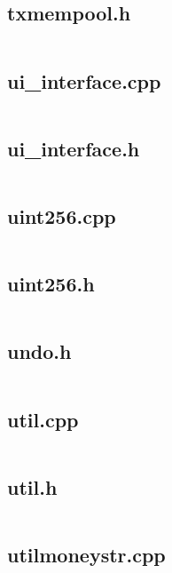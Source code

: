 \documentclass{article}
\begin{document}
\subsection{txmempool.h}
\inputminted{cpp}{/home/dufferzafar/dev/@clones/bitcoin/src/txmempool.h}
\newpage

\subsection{ui\_interface.cpp}
\inputminted{cpp}{/home/dufferzafar/dev/@clones/bitcoin/src/ui_interface.cpp}
\newpage

\subsection{ui\_interface.h}
\inputminted{cpp}{/home/dufferzafar/dev/@clones/bitcoin/src/ui_interface.h}
\newpage

\subsection{uint256.cpp}
\inputminted{cpp}{/home/dufferzafar/dev/@clones/bitcoin/src/uint256.cpp}
\newpage

\subsection{uint256.h}
\inputminted{cpp}{/home/dufferzafar/dev/@clones/bitcoin/src/uint256.h}
\newpage

\subsection{undo.h}
\inputminted{cpp}{/home/dufferzafar/dev/@clones/bitcoin/src/undo.h}
\newpage

\subsection{util.cpp}
\inputminted{cpp}{/home/dufferzafar/dev/@clones/bitcoin/src/util.cpp}
\newpage

\subsection{util.h}
\inputminted{cpp}{/home/dufferzafar/dev/@clones/bitcoin/src/util.h}
\newpage

\subsection{utilmoneystr.cpp}
\inputminted{cpp}{/home/dufferzafar/dev/@clones/bitcoin/src/utilmoneystr.cpp}
\newpage
\end{document}
